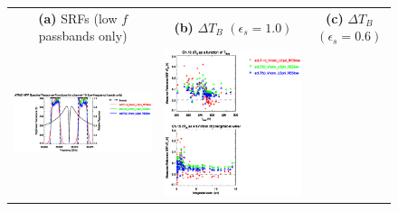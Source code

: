 \begin{figure}[H]
  \centering
  \begin{tabular}{c c c}
    \textsf{\textbf{(a)} SRFs (low $f$ passbands only)} &
    \textsf{\textbf{(b)} $\Delta T_B$ $(\epsilon_s = 1.0)$} &
    \textsf{\textbf{(c)} $\Delta T_B$ $(\epsilon_s = 0.6)$} \\
    \includegraphics[bb=80 400 280 558,clip,scale=0.85]{graphics/srf/Tset/atms_npp.ch15.osrf.eps} &
    \includegraphics[bb=85 400 260 558,clip,scale=0.85]{graphics/dtb/Tset/e1.0_r0.0/atms_npp.ch15.dTb.eps} & 

\end{tabular}
\end{figure}
